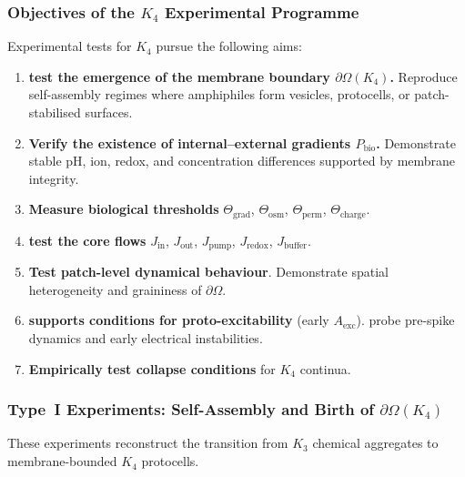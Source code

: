 \subsubsection{Objectives of the \texorpdfstring{$K_4$}{K_4} Experimental Programme}

Experimental tests for $K_4$ pursue the following aims:

\begin{enumerate}
    \item \textbf{test the emergence of the membrane boundary
          $\partial\Omega(K_4)$.}
          Reproduce self-assembly regimes where amphiphiles form vesicles,
          protocells, or patch-stabilised surfaces.

    \item \textbf{Verify the existence of internal--external gradients
          $P_{\mathrm{bio}}$.}
          Demonstrate stable pH, ion, redox, and concentration
          differences supported by membrane integrity.

    \item \textbf{Measure biological thresholds} $\Theta_{\mathrm{grad}}$,
          $\Theta_{\mathrm{osm}}$, $\Theta_{\mathrm{perm}}$,
          $\Theta_{\mathrm{charge}}$.

    \item \textbf{test the core flows}
          $J_{\mathrm{in}}$, $J_{\mathrm{out}}$, $J_{\mathrm{pump}}$,
          $J_{\mathrm{redox}}$, $J_{\mathrm{buffer}}$.

    \item \textbf{Test patch-level dynamical behaviour}.
          Demonstrate spatial heterogeneity and graininess of $\partial\Omega$.

    \item \textbf{supports conditions for proto-excitability} (early $A_{\mathrm{exc}}$).
          probe pre-spike dynamics and early electrical instabilities.

    \item \textbf{Empirically test collapse conditions} for $K_4$ continua.
\end{enumerate}



\subsubsection{Type~I Experiments: Self-Assembly and Birth of \texorpdfstring{$\partial\Omega(K_4)$}{\partial\Omega(K_4)}}

These experiments reconstruct the transition from $K_3$ chemical
aggregates to membrane-bounded $K_4$ protocells.

